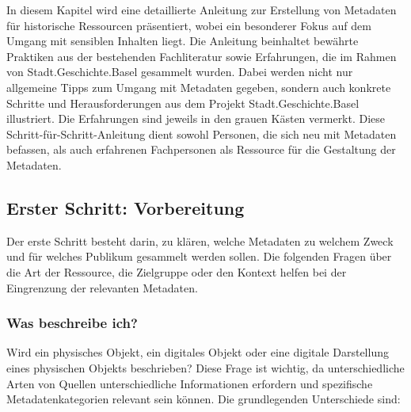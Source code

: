 \documentclass[
  letterpaper,
  DIV=11,
  numbers=noendperiod,
  landscape,
  a4paper,
  geometry:margin=1in]{scrartcl}
\begin{document}
In diesem Kapitel wird eine detaillierte Anleitung zur Erstellung von
Metadaten für historische Ressourcen präsentiert, wobei ein besonderer
Fokus auf dem Umgang mit sensiblen Inhalten liegt. Die Anleitung
beinhaltet bewährte Praktiken aus der bestehenden Fachliteratur sowie
Erfahrungen, die im Rahmen von Stadt.Geschichte.Basel gesammelt wurden.
Dabei werden nicht nur allgemeine Tipps zum Umgang mit Metadaten
gegeben, sondern auch konkrete Schritte und Herausforderungen aus dem
Projekt Stadt.Geschichte.Basel illustriert. Die Erfahrungen sind jeweils
in den grauen Kästen vermerkt. Diese Schritt-für-Schritt-Anleitung dient
sowohl Personen, die sich neu mit Metadaten befassen, als auch
erfahrenen Fachpersonen als Ressource für die Gestaltung der Metadaten.

\subsection{Erster Schritt:
Vorbereitung}\label{erster-schritt-vorbereitung}

Der erste Schritt besteht darin, zu klären, welche Metadaten zu welchem
Zweck und für welches Publikum gesammelt werden sollen. Die folgenden
Fragen über die Art der Ressource, die Zielgruppe oder den Kontext
helfen bei der Eingrenzung der relevanten Metadaten.

\subsubsection{Was beschreibe ich?}\label{was-beschreibe-ich}

Wird ein physisches Objekt, ein digitales Objekt oder eine digitale
Darstellung eines physischen Objekts beschrieben? Diese Frage ist
wichtig, da unterschiedliche Arten von Quellen unterschiedliche
Informationen erfordern und spezifische Metadatenkategorien relevant
sein können. Die grundlegenden Unterschiede sind:
\end{document}
